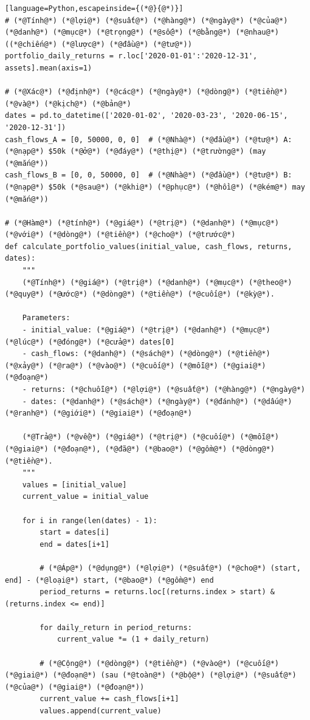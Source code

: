 \begin{lstlisting}[language=Python,escapeinside={(*@}{@*)}]
# (*@Tính@*) (*@lợi@*) (*@suất@*) (*@hàng@*) (*@ngày@*) (*@của@*) (*@danh@*) (*@mục@*) (*@trọng@*) (*@số@*) (*@bằng@*) (*@nhau@*) ((*@chiến@*) (*@lược@*) (*@đầu@*) (*@tư@*))
portfolio_daily_returns = r.loc['2020-01-01':'2020-12-31', assets].mean(axis=1)

# (*@Xác@*) (*@định@*) (*@các@*) (*@ngày@*) (*@dòng@*) (*@tiền@*) (*@và@*) (*@kịch@*) (*@bản@*)
dates = pd.to_datetime(['2020-01-02', '2020-03-23', '2020-06-15', '2020-12-31'])
cash_flows_A = [0, 50000, 0, 0]  # (*@Nhà@*) (*@đầu@*) (*@tư@*) A: (*@nạp@*) $50k (*@ở@*) (*@đáy@*) (*@thị@*) (*@trường@*) (may (*@mắn@*))
cash_flows_B = [0, 0, 50000, 0]  # (*@Nhà@*) (*@đầu@*) (*@tư@*) B: (*@nạp@*) $50k (*@sau@*) (*@khi@*) (*@phục@*) (*@hồi@*) (*@kém@*) may (*@mắn@*))

# (*@Hàm@*) (*@tính@*) (*@giá@*) (*@trị@*) (*@danh@*) (*@mục@*) (*@với@*) (*@dòng@*) (*@tiền@*) (*@cho@*) (*@trước@*)
def calculate_portfolio_values(initial_value, cash_flows, returns, dates):
    """
    (*@Tính@*) (*@giá@*) (*@trị@*) (*@danh@*) (*@mục@*) (*@theo@*) (*@quy@*) (*@ước@*) (*@dòng@*) (*@tiền@*) (*@cuối@*) (*@kỳ@*).

    Parameters:
    - initial_value: (*@giá@*) (*@trị@*) (*@danh@*) (*@mục@*) (*@lúc@*) (*@đóng@*) (*@cửa@*) dates[0]
    - cash_flows: (*@danh@*) (*@sách@*) (*@dòng@*) (*@tiền@*) (*@xảy@*) (*@ra@*) (*@vào@*) (*@cuối@*) (*@mỗi@*) (*@giai@*) (*@đoạn@*)
    - returns: (*@chuỗi@*) (*@lợi@*) (*@suất@*) (*@hàng@*) (*@ngày@*)
    - dates: (*@danh@*) (*@sách@*) (*@ngày@*) (*@đánh@*) (*@dấu@*) (*@ranh@*) (*@giới@*) (*@giai@*) (*@đoạn@*)

    (*@Trả@*) (*@về@*) (*@giá@*) (*@trị@*) (*@cuối@*) (*@mỗi@*) (*@giai@*) (*@đoạn@*), (*@đã@*) (*@bao@*) (*@gồm@*) (*@dòng@*) (*@tiền@*).
    """
    values = [initial_value]
    current_value = initial_value

    for i in range(len(dates) - 1):
        start = dates[i]
        end = dates[i+1]

        # (*@Áp@*) (*@dụng@*) (*@lợi@*) (*@suất@*) (*@cho@*) (start, end] - (*@loại@*) start, (*@bao@*) (*@gồm@*) end
        period_returns = returns.loc[(returns.index > start) & (returns.index <= end)]

        for daily_return in period_returns:
            current_value *= (1 + daily_return)

        # (*@Cộng@*) (*@dòng@*) (*@tiền@*) (*@vào@*) (*@cuối@*) (*@giai@*) (*@đoạn@*) (sau (*@toàn@*) (*@bộ@*) (*@lợi@*) (*@suất@*) (*@của@*) (*@giai@*) (*@đoạn@*))
        current_value += cash_flows[i+1]
        values.append(current_value)


\end{lstlisting}
